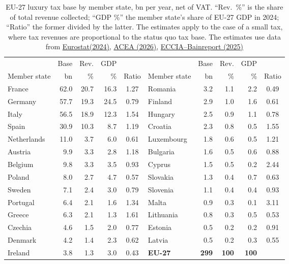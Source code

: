 \documentclass{article}
\begin{document}
\begin{table}[htbp]
\centering
\small
\begin{tabular}{lrrrc@{\qquad}lrrrc}
\hline\hline
& Base & Rev. & GDP & & & Base & Rev. & GDP & \\
Member state & \EUR{}bn & \% & \% & Ratio & Member state & \EUR{}bn & \% & \% & Ratio \\
\hline
France & 62.0 & 20.7 & 16.3 & 1.27 & Romania & 3.2 & 1.1 & 2.2 & 0.49 \\
Germany & 57.7 & 19.3 & 24.5 & 0.79 & Finland & 2.9 & 1.0 & 1.6 & 0.61 \\
Italy & 56.5 & 18.9 & 12.3 & 1.54 & Hungary & 2.5 & 0.9 & 1.1 & 0.78 \\
Spain & 30.9 & 10.3 & 8.7 & 1.19 & Croatia & 2.3 & 0.8 & 0.5 & 1.55 \\
Netherlands & 11.0 & 3.7 & 6.0 & 0.61 & Luxembourg & 1.8 & 0.6 & 0.5 & 1.21 \\
Austria & 9.9 & 3.3 & 2.8 & 1.18 & Bulgaria & 1.6 & 0.5 & 0.6 & 0.88 \\
Belgium & 9.8 & 3.3 & 3.5 & 0.93 & Cyprus & 1.5 & 0.5 & 0.2 & 2.44 \\
Poland & 8.0 & 2.7 & 4.7 & 0.57 & Slovakia & 1.3 & 0.4 & 0.7 & 0.63 \\
Sweden & 7.1 & 2.4 & 3.0 & 0.79 & Slovenia & 1.1 & 0.4 & 0.4 & 0.93 \\
Portugal & 6.4 & 2.1 & 1.6 & 1.34 & Malta & 0.9 & 0.3 & 0.1 & 3.11 \\
Greece & 6.3 & 2.1 & 1.3 & 1.61 & Lithuania & 0.8 & 0.3 & 0.5 & 0.53 \\
Czechia & 4.6 & 1.5 & 2.0 & 0.77 & Estonia & 0.5 & 0.2 & 0.2 & 0.91 \\
Denmark & 4.2 & 1.4 & 2.3 & 0.62 & Latvia & 0.5 & 0.2 & 0.3 & 0.55 \\
Ireland & 3.8 & 1.3 & 3.0 & 0.43 & \textbf{EU-27} & \textbf{299} & \textbf{100} & \textbf{100} & \\ %
\hline\hline
\end{tabular}
\caption{EU-27 luxury tax base by member state, \EUR{}bn per year, net of VAT.
``Rev.\ \%'' is the share of total revenue collected; ``GDP \%'' the member
state's share of EU-27 GDP in 2024; ``Ratio'' the former divided by the latter.
The estimates apply to the case of a small tax, where tax revenues are proportional to the status quo tax base. The estimates use data from \href{https://ec.europa.eu/eurostat/statistics-explained/index.php?title=Tourism_statistics}{Eurostat(2024)}, \href{https://www.acea.auto/pc-registrations/new-car-registrations-1-8-in-2025-battery-electric-17-4-market-share/}{ACEA (2026)}, \href{https://www.eccia.eu/assets/activities/files/ECCIA\%20Bain\%20Report_Walpole\%20FINAL\%20Digital\%20Singles.pdf}{ECCIA--Bainreport (2025)} %
}
\end{table}
\end{document}
